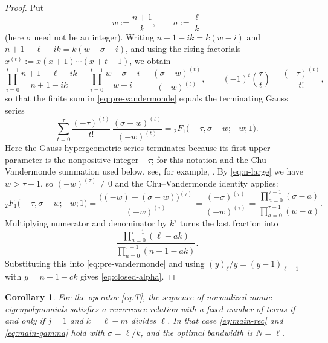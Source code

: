 \documentclass{amsart}
\newtheorem{corollary}[theorem]{Corollary}
\theoremstyle{definition}
\newcommand{\fall}[2]{(#1)_{#2}}
\begin{document}
\begin{proof}
Put
\[
w:=\frac{n+1}{k},
\qquad
\sigma:=\frac{\ell}{k}
\]
(here \(\sigma\) need not be an integer).  Writing
\(n+1-ik=k(w-i)\) and \(n+1-\ell-ik=k(w-\sigma-i)\), and using the rising
factorials \(x^{(t)}:=x(x+1)\cdots(x+t-1)\), we obtain
\[
\prod_{i=0}^{t-1}\frac{n+1-\ell-ik}{n+1-ik}
=\prod_{i=0}^{t-1}\frac{w-\sigma-i}{w-i}
=\frac{(\sigma-w)^{(t)}}{(-w)^{(t)}},
\qquad
(-1)^t\binom{\tau}{t}=\frac{(-\tau)^{(t)}}{t!},
\]
so that the finite sum in \eqref{eq:pre-vandermonde} equals the terminating
Gauss series
\[
\sum_{t=0}^{\tau}\frac{(-\tau)^{(t)}}{t!}\,
\frac{(\sigma-w)^{(t)}}{(-w)^{(t)}}
={}_2F_1\bigl(-\tau,\sigma-w;-w;1\bigr).
\]
Here the Gauss hypergeometric series terminates because its first upper
parameter is the nonpositive integer \(-\tau\); for this notation and the
Chu--Vandermonde summation used below, see, for example,
\cite[Appendix~III]{Slater}.  By \eqref{eq:n-large} we have \(w>\tau-1\), so
\((-w)^{(\tau)}\ne0\) and the Chu--Vandermonde identity applies:
\[
{}_2F_1\bigl(-\tau,\sigma-w;-w;1\bigr)
=\frac{\bigl((-w)-(\sigma-w)\bigr)^{(\tau)}}{(-w)^{(\tau)}}
=\frac{(-\sigma)^{(\tau)}}{(-w)^{(\tau)}}
=\frac{\prod_{a=0}^{\tau-1}(\sigma-a)}{\prod_{a=0}^{\tau-1}(w-a)} .
\]
Multiplying numerator and denominator by \(k^\tau\) turns the last fraction
into
\[
\frac{\prod_{a=0}^{\tau-1}(\ell-ak)}{\prod_{a=0}^{\tau-1}(n+1-ak)} .
\]
Substituting this into \eqref{eq:pre-vandermonde} and using
\(\fall{y}{\ell}/y=\fall{y-1}{\ell-1}\) with \(y=n+1-ck\) gives
\eqref{eq:closed-alpha}.
\end{proof}

\begin{corollary}\label{cor:classification}
For the operator \eqref{eq:T}, the sequence of normalized monic
eigenpolynomials satisfies a recurrence relation with a fixed number of
terms if and only if \(j=1\) and \(k=\ell-m\) divides \(\ell\).  In that
case \eqref{eq:main-rec} and \eqref{eq:main-gamma} hold with
\(\sigma=\ell/k\), and the optimal bandwidth is \(N=\ell\).
\end{corollary}
\end{document}
